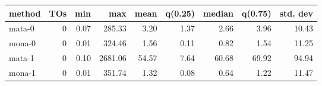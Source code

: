 \begin{tabular}{lrrrrrrrr}
\hline
 method   &   TOs &   min &     max &   mean &   q(0.25) &   median &   q(0.75) &   std. dev \\
\hline
 mata-0   &  0 &  0.07 &  285.33 &   3.20 &      1.37 &     2.66 &      3.96 &      10.43 \\
 mona-0   &  0 &  0.01 &  324.46 &   1.56 &      0.11 &     0.82 &      1.54 &      11.25 \\
 mata-1   &  0 &  0.10 & 2681.06 &  54.57 &      7.64 &    60.68 &     69.92 &      94.94 \\
 mona-1   &  0 &  0.01 &  351.74 &   1.32 &      0.08 &     0.64 &      1.22 &      11.47 \\
\hline
\end{tabular}
